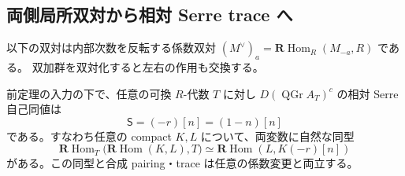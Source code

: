 \subsection{両側局所双対から相対 Serre trace へ}

以下の双対は内部次数を反転する係数双対
$(M^\vee)_a=\mathbf R\operatorname{Hom}_R(M_{-a},R)$ である。
双加群を双対化すると左右の作用も交換する。

\begin{theorem}
\label{thm:nfm-relative-serre}
前定理の入力の下で、任意の可換 $R$-代数 $T$ に対し
$D(\operatorname{QGr}A_T)^c$ の相対 Serre 自己同値は
\[
 \mathsf S=(-r)[n]=(1-n)[n]
\]
である。すなわち任意の compact $K,L$ について、両変数に自然な同型
\[
 \mathbf R\operatorname{Hom}_T
   \bigl(\mathbf R\operatorname{Hom}(K,L),T\bigr)
 \simeq\mathbf R\operatorname{Hom}(L,K(-r)[n])
\]
がある。この同型と合成 pairing・trace は任意の係数変更と両立する。
\end{theorem}

